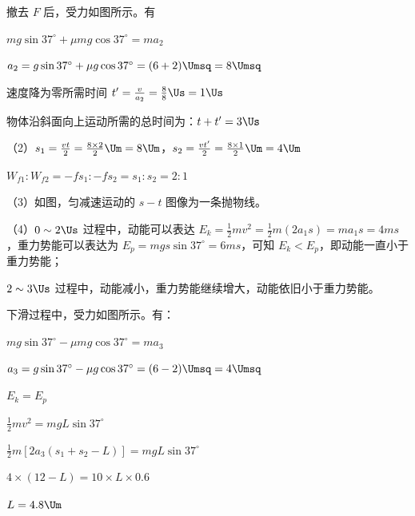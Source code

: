 \documentclass[\gkver]{gaokaozhenti}
\begin{document}
\begin{enumerate}
{撤去 $F$ 后，受力如图所示。有

$mg\sin 37^{\circ} + \mu mg\cos 37^{\circ} = ma_{2}$

$a_{2} = g\sin 37^{\circ} + \mu g\cos 37^{\circ} = (6 + 2)\Umsq = 8\Umsq$

速度降为零所需时间 $t' = \frac{v}{a_{2}} = \frac{8}{8}\Us = 1\Us$

物体沿斜面向上运动所需的总时间为：$t + t' = 3\Us$

（2）$s_{1} = \frac{vt}{2} = \frac{8 \times 2}{2}\Um = 8\Um$，$s_{2} = \frac{vt'}{2} = \frac{8 \times 1}{2}\Um = 4\Um$

$W_{f1}:W_{f2} = -fs_{1}:-fs_{2} = s_{1}:s_{2} = 2:1$

（3）如图，匀减速运动的 $s-t$ 图像为一条抛物线。

\onepicture[h=3.6cm]{}

（4）$0 \sim 2\Us$ 过程中，动能可以表达 $E_{k} = \frac{1}{2}mv^{2} = \frac{1}{2}m(2a_{1}s) = ma_{1}s = 4ms$，重力势能可以表达为 $E_{p} = mgs\sin 37^{\circ} = 6ms$，可知 $E_{k} < E_{p}$，即动能一直小于重力势能；

$2 \sim 3\Us$ 过程中，动能减小，重力势能继续增大，动能依旧小于重力势能。

\onepicture[h=2.6cm, align=right]{}

下滑过程中，受力如图所示。有：

$mg\sin 37^{\circ} - \mu mg\cos 37^{\circ} = ma_{3}$

$a_{3} = g\sin 37^{\circ} - \mu g\cos 37^{\circ} = (6 - 2)\Umsq = 4\Umsq$

$E_{k} = E_{p}$

$\frac{1}{2}mv^{2} = mgL\sin 37^{\circ}$

$\frac{1}{2}m\left[2a_{3}(s_{1} + s_{2} - L)\right] = mgL\sin 37^{\circ}$

$4 \times (12 - L) = 10 \times L \times 0.6$

$L = 4.8\Um$
}

\end{enumerate}
\end{document}
